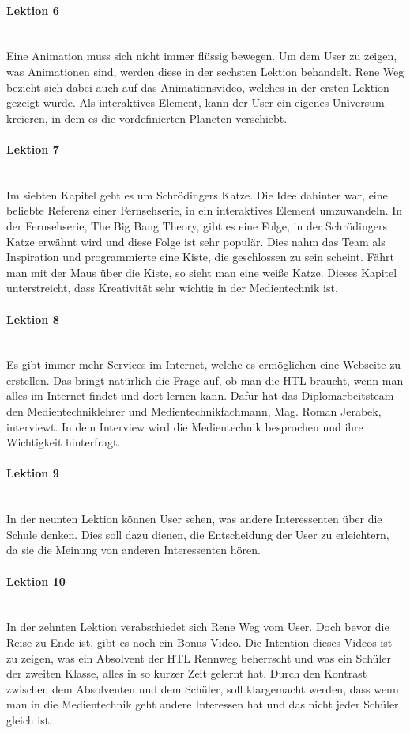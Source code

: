 \paragraph{Lektion 6}\\
Eine Animation muss sich nicht immer flüssig bewegen. Um dem User zu zeigen, was Animationen sind, werden diese in der sechsten Lektion behandelt. Rene Weg bezieht sich dabei auch auf das Animationsvideo, welches in der ersten Lektion gezeigt wurde. Als interaktives Element, kann der User ein eigenes Universum kreieren, in dem es die vordefinierten Planeten verschiebt. 

\paragraph{Lektion 7}\\
Im siebten Kapitel geht es um Schrödingers Katze. Die Idee dahinter war, eine beliebte Referenz einer Fernsehserie, in ein interaktives Element umzuwandeln. In der Fernsehserie, The Big Bang Theory, gibt es eine Folge, in der Schrödingers Katze erwähnt wird und diese Folge ist sehr populär. Dies nahm das Team als Inspiration und programmierte eine Kiste, die geschlossen zu sein scheint. Fährt man mit der Maus über die Kiste, so sieht man eine weiße Katze. Dieses Kapitel unterstreicht, dass Kreativität sehr wichtig in der Medientechnik ist.

\paragraph{Lektion 8}\\
Es gibt immer mehr Services im Internet, welche es ermöglichen eine Webseite zu erstellen. Das bringt natürlich die Frage auf, ob man die HTL braucht, wenn man alles im Internet findet und dort lernen kann. Dafür hat das Diplomarbeitsteam den Medientechniklehrer und Medientechnikfachmann, Mag. Roman Jerabek, interviewt. In dem Interview wird die Medientechnik besprochen und ihre Wichtigkeit hinterfragt.

\paragraph{Lektion 9}\\
In der neunten Lektion können User sehen, was andere Interessenten über die Schule denken. Dies soll dazu dienen, die Entscheidung der User zu erleichtern, da sie die Meinung von anderen Interessenten hören.

\paragraph{Lektion 10}\\
In der zehnten Lektion verabschiedet sich Rene Weg vom User. Doch bevor die Reise zu Ende ist, gibt es noch ein Bonus-Video. Die Intention dieses Videos ist zu zeigen, was ein Absolvent der HTL Rennweg beherrscht und was ein Schüler der zweiten Klasse, alles in so kurzer Zeit gelernt hat. Durch den Kontrast zwischen dem Absolventen und dem Schüler, soll klargemacht werden, dass wenn man in die Medientechnik geht andere Interessen hat und das nicht jeder Schüler gleich ist.

